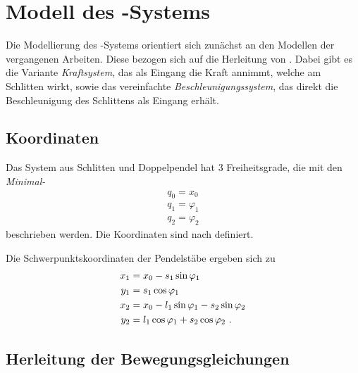 \section{Modell des \spd-Systems}\label{sec:spdModell}


Die Modellierung des \spd-Systems orientiert sich zunächst an den Modellen der vergangenen Arbeiten. 
Diese bezogen sich auf die Herleitung von \cite{modpen}. 
Dabei gibt es die Variante \emph{Kraftsystem}, das als Eingang die Kraft annimmt, welche am Schlitten wirkt, sowie das vereinfachte \emph{Beschleunigungssystem}, das direkt die Beschleunigung des Schlittens als Eingang erhält.



\begin{figure}[h]
	\centering
		
			\caption{\dpd}
	 \label{fig:koord}
\end{figure}

\subsection{Koordinaten}

Das System aus Schlitten und Doppelpendel hat 3 Freiheitsgrade, die mit den \emph{Minimal-\koor} 
\begin{align*}
	q_0 = x_0  \\
	q_1 = \varphi_1  \\
	q_2 = \varphi_2
\end{align*}
beschrieben werden. Die Koordinaten sind nach  definiert.

Die Schwerpunktskoordinaten der Pendelstäbe ergeben sich zu
\begin{align*}
	x_1 &= x_0 - s_1 \sin{\ensuremath{\varphi_1}}  \\
	y_1 &=       s_1 \cos{\ensuremath{\varphi_1}}  \\
	x_2 &= x_0 - l_1 \sin{\ensuremath{\varphi_1}} - s_2 \sin{\ensuremath{\varphi_2}}  \\
	y_2 &=       l_1 \cos{\ensuremath{\varphi_1}} + s_2 \cos{\ensuremath{\varphi_2}}  \ .
\end{align*}


\subsection{Herleitung der Bewegungsgleichungen}

